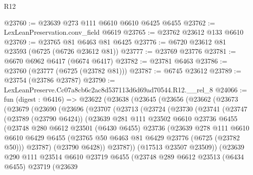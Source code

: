 \begin{lexlean}{R12}
\begin{coremodule}
@23760 := @23639 @273 @111 @6610 @6610 @6425 @6455
@23762 := LexLeanPreservation.conv_field @6619
@23765 := @23762 @23612 @133 @6610
@23769 := @23765 @81 @6463 @81 @6425
@23776 := @6720 @23612 @81 @23593 (@6725 (@6726 @23612 @81))
@23777 := @23769 @23776
@23781 := @6670 @6962 @6417 (@6674 @6417)
@23782 := @23781 @6463
@23786 := @23760 (@23777 (@6725 (@23782 @81)))
@23787 := @6745 @23612
@23789 := @23754 (@23786 @23787)
@23790 := LexLeanPreserve.Cc07a8cb6c2ac8d537113d6d69ad70544.R12.__rel_8
@24066 := fun (digest : @6416) =>
  @23622
    (@23638
      (@23645
        (@23656
          (@23662
            (@23673
              (@23679
                (@23690
                  (@23696
                    (@23707
                      (@23713
                        (@23724
                          (@23730
                            (@23741
                              (@23747
                                (@23789 (@23790 @6424))
                                (@23639
                                  @281
                                  @111
                                  @23502
                                  @6610
                                  @23736
                                  @6455
                                  (@23748
                                    @280
                                    @6612
                                    @23501
                                    (@6430 @6455)
                                    @23736
                                    (@23639
                                      @278
                                      @111
                                      @6610
                                      @6610
                                      @6429
                                      @6455
                                      (@23765 @50 @6463 @81 @6429 @23776 (@6725 (@23782 @50)))
                                      @23787)
                                    (@23790 @6428))
                                  @23787))
                              (@17513 @23507 @23509))
                            (@23639
                              @290
                              @111
                              @23514
                              @6610
                              @23719
                              @6455
                              (@23748
                                @289
                                @6612
                                @23513
                                (@6434 @6455)
                                @23719
                                (@23639

\end{coremodule}
\end{lexlean}
